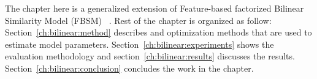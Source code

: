 The chapter here is a generalized extension of 
Feature-based factorized  Bilinear Similarity Model (FBSM)~\cite{r43} . 
Rest of the chapter is organized as follow: 
Section~\ref{ch:bilinear:method} %
describes \CF and optimization methods that are used to estimate
model parameters. Section~\ref{ch:bilinear:experiments}  %
shows the evaluation methodology and section~\ref{ch:bilinear:results} %
discusses the results. 
Section~\ref{ch:bilinear:conclusion} %
concludes the work in the chapter.
